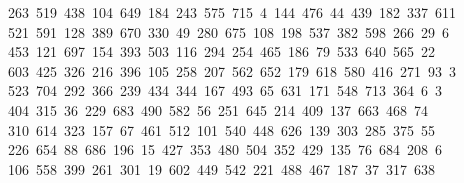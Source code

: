 \begin{tabbing}
\>\ 263\ 519\ 438\ 104\ 649\ 184\ 243\ 575\ 715\ 4\ 144\ 476\ 44\ 439\ 182\ 337\ 611\\[0pt]
\>\ 521\ 591\ 128\ 389\ 670\ 330\ 49\ 280\ 675\ 108\ 198\ 537\ 382\ 598\ 266\ 29\ 6\\[0pt]
\ 453\ 121\ 697\ 154\ 393\ 503\ 116\ 294\ 254\ 465\ 186\ 79\ 533\ 640\ 565\ 22\\[0pt]
\>\ 603\ 425\ 326\ 216\ 396\ 105\ 258\ 207\ 562\ 652\ 179\ 618\ 580\ 416\ 271\ 93\ 3\\[0pt]
\ 523\ 704\ 292\ 366\ 239\ 434\ 344\ 167\ 493\ 65\ 631\ 171\ 548\ 713\ 364\ 6\ 3\\[0pt]
\ 404\ 315\ 36\ 229\ 683\ 490\ 582\ 56\ 251\ 645\ 214\ 409\ 137\ 663\ 468\ 74\ \\[0pt]
\ 310\ 614\ 323\ 157\ 67\ 461\ 512\ 101\ 540\ 448\ 626\ 139\ 303\ 285\ 375\ 55\\[0pt]
\ 226\ 654\ 88\ 686\ 196\ 15\ 427\ 353\ 480\ 504\ 352\ 429\ 135\ 76\ 684\ 208\ 6\\[0pt]
\ 106\ 558\ 399\ 261\ 301\ 19\ 602\ 449\ 542\ 221\ 488\ 467\ 187\ 37\ 317\ 638\\[0pt]

\end{tabbing}
